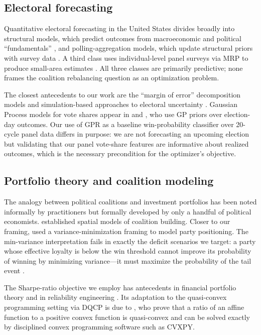 \documentclass[12pt, letterpaper]{article}
\theoremstyle{definition}
\begin{document}
\subsection{Electoral forecasting}

Quantitative electoral forecasting in the United States divides broadly into
structural models, which predict outcomes from macroeconomic and political
``fundamentals'' \citep{Fair1978, Abramowitz2008, Hibbs2012}, and
polling-aggregation models, which update structural priors with survey data
\citep{Erikson2014, Linzer2013}. A third class uses individual-level panel
surveys via MRP to produce small-area estimates \citep{GelmanLittle1997,
Lax2009, Wang2015}. All three classes are primarily predictive; none frames
the coalition rebalancing question as an optimization problem.

The closest antecedents to our work are the ``margin of error'' decomposition
models \citep{King1991} and simulation-based approaches to electoral uncertainty
\citep{Jackman2005, Strauss2007}. Gaussian Process models for vote shares appear
in \citet{Linzer2013} and \citet{Lock2010}, who use GP priors over election-day
outcomes. Our use of GPR as a baseline win-probability classifier over 20-cycle
panel data differs in purpose: we are not forecasting an upcoming election but
validating that our panel vote-share features are informative about realized
outcomes, which is the necessary precondition for the optimizer's objective.

\subsection{Portfolio theory and coalition modeling}

The analogy between political coalitions and investment portfolios has been noted
informally by practitioners but formally developed by only a handful of political
economists. \citet{Enelow1984} established spatial models of coalition building.
Closer to our framing, \citet{Erikson2012} used a variance-minimization framing
to model party positioning. The min-variance interpretation fails in exactly the
deficit scenarios we target: a party whose effective loyalty is below the win
threshold cannot improve its probability of winning by minimizing variance---it
must maximize the probability of the tail event \citep{Roy1952}.

The Sharpe-ratio objective we employ has antecedents in financial portfolio theory
\citep{Sharpe1966} and in reliability engineering \citep{Roy1952}. Its adaptation
to the quasi-convex programming setting via DQCP is due to \citet{DiamondBoyd2019},
who prove that a ratio of an affine function to a positive convex function is
quasi-convex and can be solved exactly by disciplined convex programming software
such as CVXPY.
\end{document}
